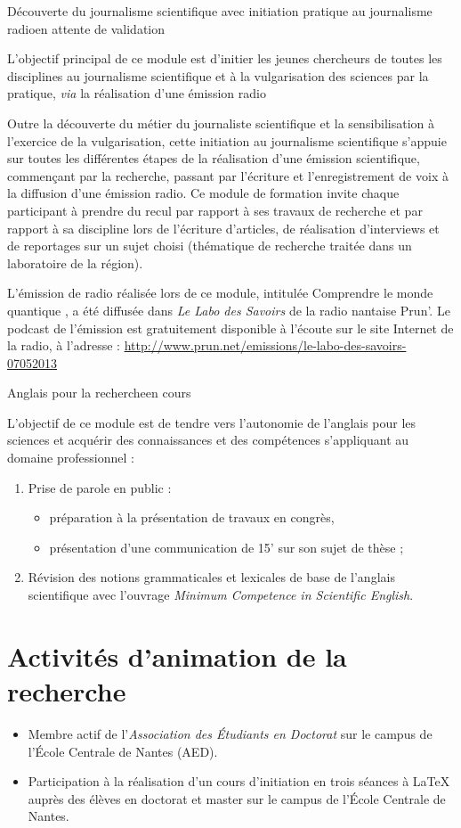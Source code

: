 \formation
{Découverte du journalisme scientifique avec initiation pratique au journalisme radio}{en attente de validation}
{L'objectif principal de ce module est d'initier les jeunes chercheurs de toutes les disciplines au journalisme scientifique et à la vulgarisation des sciences par la pratique, \textit{via} la réalisation d'une émission radio

Outre la découverte du métier du journaliste scientifique et la sensibilisation à l'exercice de la vulgarisation, cette initiation au journalisme scientifique s'appuie sur toutes les différentes étapes de la réalisation d'une émission scientifique, commençant par la recherche, passant par l'écriture et l'enregistrement de voix à la diffusion d'une émission radio. Ce module de formation invite chaque participant à prendre du recul par rapport à ses travaux de recherche et par rapport à sa discipline lors de l'écriture d'articles, de réalisation d'interviews et de reportages sur un sujet choisi (thématique de recherche traitée dans un laboratoire de la région).

L'émission de radio réalisée lors de ce module, intitulée \og Comprendre le monde quantique \fg, a été diffusée dans \textit{Le Labo des Savoirs} de la radio nantaise Prun'.
Le podcast de l'émission est gratuitement disponible à l'écoute sur le site Internet de la radio,
à l'adresse : \url{http://www.prun.net/emissions/le-labo-des-savoirs-07052013}}

\formation
{Anglais pour la recherche}{en cours}
{L'objectif de ce module est de tendre vers l'autonomie de l'anglais pour les sciences et acquérir des connaissances et des compétences s'appliquant au domaine professionnel :
\begin{enumerate}
  \item Prise de parole en public :
  \begin{itemize}
    \item préparation à la présentation de travaux en congrès,
    \item présentation d'une communication de 15' sur son sujet de thèse ;
  \end{itemize}
  \item Révision des notions grammaticales et lexicales de base de l'anglais scientifique avec l'ouvrage \textit{Minimum Competence in Scientific English}.
\end{enumerate}}



\section{Activités d'animation de la recherche}
\begin{itemize}
\renewcommand{\labelitemi}{\qquad$\bullet$}
  \item Membre actif de l'\emph{Association des Étudiants en Doctorat} sur le campus de l'École Centrale de Nantes (AED).
  \item Participation à la réalisation d'un cours d'initiation en trois séances à \LaTeX{} auprès des élèves en doctorat et master sur le campus de l'École Centrale de Nantes.
\end{itemize}
